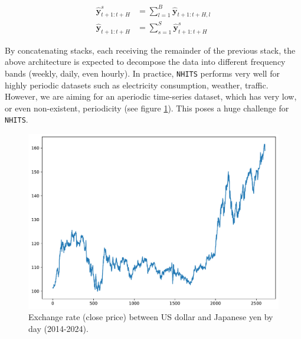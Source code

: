 \documentclass[aps,prb,groupedaddress,twocolumn,showpacs,dvipdfmx,superscriptaddress,pdftex]{revtex4-2}
\begin{document}
\begin{align}
    \mathbf{\hat{y}}_{t+1:t+H}^s &= \sum_{l=1}^{B}{\mathbf{\hat{y}}_{t+1:t+H, l}} \label{eq:sum_block}\\
    \mathbf{\hat{y}}_{t+1:t+H} &= \sum_{s=1}^{S}{\mathbf{\hat{y}}_{t+1:t+H}^s} \label{eq:sum_stack}
\end{align}


By concatenating stacks, each receiving the remainder of the previous stack, the above architecture is expected to decompose the data into different frequency bands (weekly, daily, even hourly). In practice, \verb|NHITS| performs very well for highly periodic datasets such as electricity consumption, weather, traffic. However, we are aiming for an aperiodic time-series dataset, which has very low, or even non-existent, periodicity (see figure \ref{fig:fx}). This poses a huge challenge for \verb|NHITS|.

\begin{figure}[h]
    \centering
    \includegraphics[width=\linewidth]{img/USD_JPY.pdf}
    \caption{Exchange rate (close price) between US dollar and Japanese yen by day (2014-2024).}
    \label{fig:fx}
\end{figure}
\end{document}

